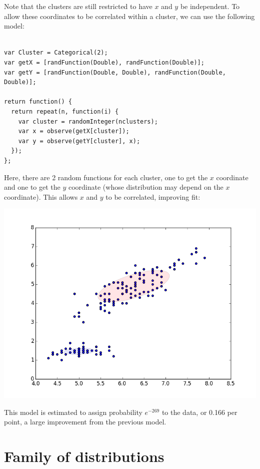 \documentclass{article}
\begin{document}
  Note that the clusters are still restricted to have $x$ and $y$ be independent.  To allow these coordinates
  to be correlated within a cluster, we can use the following model:

\begin{verbatim}

var Cluster = Categorical(2);
var getX = [randFunction(Double), randFunction(Double)];
var getY = [randFunction(Double, Double), randFunction(Double, Double)];

return function() {
  return repeat(n, function(i) {
    var cluster = randomInteger(nclusters);
    var x = observe(getX[cluster]);
    var y = observe(getY[cluster], x);
  });
};
\end{verbatim}
  
  Here, there are 2 random functions for each cluster, one to get the $x$ coordinate and one to get the $y$ coordinate (whose distribution may depend on the $x$ coordinate).  This allows $x$ and $y$ to be correlated, improving fit:

  \begin{center}
    \includegraphics[scale=0.5]{../plots/irisclusters_dep.png}
  \end{center}

  This model is estimated to assign probability $e^{-269}$ to the data, or 0.166 per point, a large improvement from the previous model.


  \section{Family of distributions}
  
\end{document}
